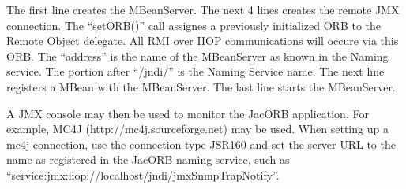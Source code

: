 The first line creates the MBeanServer.
The next 4 lines creates the remote JMX connection. The "`setORB()"' call assignes a previously
initialized ORB to the Remote Object delegate. All RMI over IIOP communications will occure
via this ORB. The "`address"' is the name of the MBeanServer as known in the Naming service.
The portion after "`/jndi/"' is the Naming Service name.
The next line registers a MBean with the MBeanServer.
The last line starts the MBeanServer.

A JMX console may then be used to monitor the JacORB application. For example, MC4J (http://mc4j.sourceforge.net) may be used. When setting up a mc4j connection, use the connection type JSR160 and set the server URL to the name as registered in the JacORB naming service, such as
"`service:jmx:iiop://localhost/jndi/jmxSnmpTrapNotify"'.

